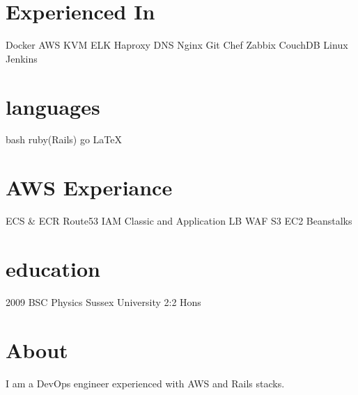 \documentclass[]{friggeri-cv-a4}
\begin{document}

\begin{aside}
	\section{Experienced In}
    Docker
    AWS
    KVM
    ELK
    Haproxy
    DNS
    Nginx
    Git
    Chef
    Zabbix
    CouchDB
		Linux
		Jenkins
  \section{languages}
    bash
		ruby(Rails)
    go
    \LaTeX
  \section{AWS Experiance}
    ECS \& ECR
    Route53
    IAM
    Classic and Application LB
    WAF
    S3
    EC2
    Beanstalks
  \section{education}
    2009 BSC Physics Sussex University 2:2 Hons
\end{aside}

\section{About}
I am a DevOps engineer experienced with AWS and Rails stacks.  
\end{document}
